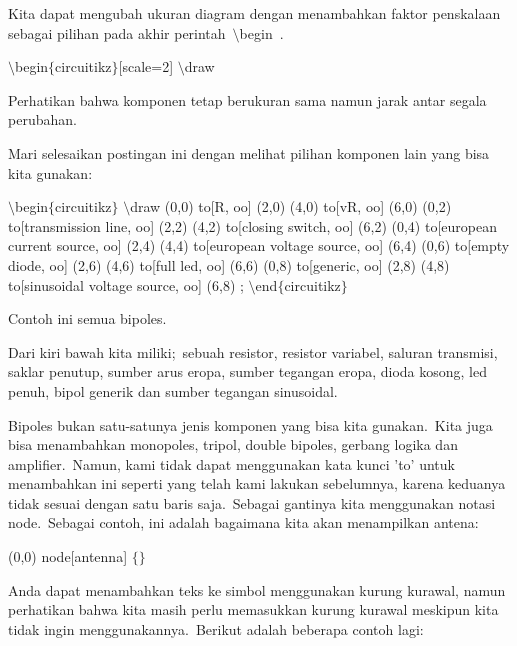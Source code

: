 \noindent 
Kita dapat mengubah ukuran diagram dengan menambahkan faktor penskalaan sebagai pilihan pada akhir perintah $\setminus$begin .
\par


\noindent 
 $\setminus$begin$ \{ $circuitikz$ \} $[scale=2] $\setminus$draw 
\par


\noindent 
Perhatikan bahwa komponen tetap berukuran sama namun jarak antar segala perubahan.
\par


\noindent 
Mari selesaikan postingan ini dengan melihat pilihan komponen lain yang bisa kita gunakan:
\par


\noindent 
 $\setminus$begin$ \{ $circuitikz$ \} $ $\setminus$draw (0,0) to[R, oo] (2,0) (4,0) to[vR, oo] (6,0) (0,2) to[transmission line, oo] (2,2) (4,2) to[closing switch, oo] (6,2) (0,4) to[european current source, oo] (2,4) (4,4) to[european voltage source, oo] (6,4) (0,6) to[empty diode, oo] (2,6) (4,6) to[full led, oo] (6,6) (0,8) to[generic, oo] (2,8) (4,8) to[sinusoidal voltage source, oo] (6,8) ; $\setminus$end$ \{ $circuitikz$ \} $ 
\par


\noindent 
Contoh ini semua bipoles.
\par


\noindent 
Dari kiri bawah kita miliki; sebuah resistor, resistor variabel, saluran transmisi, saklar penutup, sumber arus eropa, sumber tegangan eropa, dioda kosong, led penuh, bipol generik dan sumber tegangan sinusoidal.
\par


\noindent 
Bipoles bukan satu-satunya jenis komponen yang bisa kita gunakan. Kita juga bisa menambahkan monopoles, tripol, double bipoles, gerbang logika dan amplifier. Namun, kami tidak dapat menggunakan kata kunci 'to' untuk menambahkan ini seperti yang telah kami lakukan sebelumnya, karena keduanya tidak sesuai dengan satu baris saja. Sebagai gantinya kita menggunakan notasi node. Sebagai contoh, ini adalah bagaimana kita akan menampilkan antena:
\par


\noindent 
 (0,0) node[antenna] $ \{ $$ \} $ 
\par


\noindent 
Anda dapat menambahkan teks ke simbol menggunakan kurung kurawal, namun perhatikan bahwa kita masih perlu memasukkan kurung kurawal meskipun kita tidak ingin menggunakannya. Berikut adalah beberapa contoh lagi:
\par


